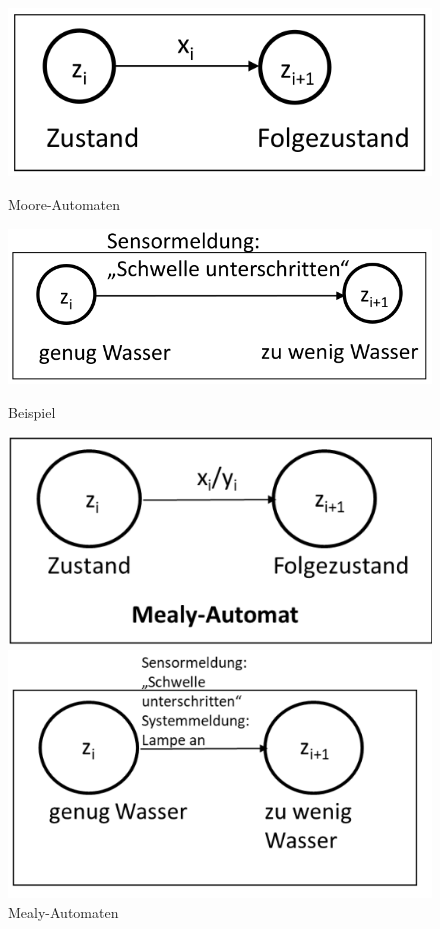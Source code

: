 \begin{figure}[H]
    \centering
    \begin{minipage}{.48\linewidth}
        \centering
        \includegraphics[width=.95\linewidth]{Graphics/Moore_automaten_1.png}
        \caption{Moore-Automaten}
    \end{minipage}
    \begin{minipage}{.48\linewidth}
        \centering
        \includegraphics[width=.95\linewidth]{Graphics/Moore_automaten_2.png}
        \caption{Beispiel}
    \end{minipage}
    \begin{minipage}{.48\linewidth}
        \centering
        \includegraphics[width=.95\linewidth]{Graphics/Mealy_automaten_1.png}
        \caption{Mealy-Automaten}
    \end{minipage}
    \begin{minipage}{.48\linewidth}
        \centering
        \includegraphics[width=.95\linewidth]{Graphics/Mealy_automaten_2.png}

\end{minipage}
\end{figure}
